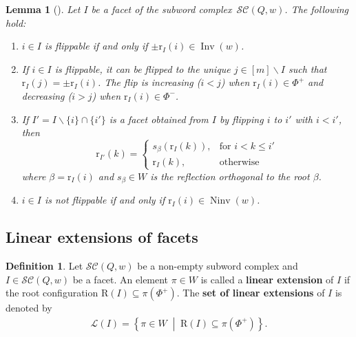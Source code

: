 \documentclass{amsart}
\newtheorem{lemma}[theorem]{Lemma}
\theoremstyle{definition}
\newtheorem{definition}[theorem]{Definition}
\newcommand{\set}[2]{\left\{ #1 \;\middle|\; #2 \right\}} %
\DeclareMathOperator{\Inv}{Inv} %
\DeclareMathOperator{\Ninv}{Ninv} %
\newcommand{\defn}[1]{\textbf{\textsf{\color{PineGreen} #1}}} %
\newcommand{\linearExtensions}{\mathcal{L}} %
\newcommand{\subwordComplex}{\mathcal{SC}} %
\newcommand{\Roots}{\mathrm{R}} %
\newcommand{\rootFunction}[2]{\mathrm{r}_{#1}(#2)} %
\begin{document}
\begin{lemma}[{\cite{CeballosLabbeStump, KnutsonMiller-subwordComplex}}]
\label{lem_rootfunction_flips}
Let $I$ be a facet of the subword complex~$\subwordComplex(Q,w)$.
The following hold:
\begin{enumerate}
    \item $i \in I$ is flippable if and only if $\pm \rootFunction{I}{i} \in \Inv(w)$.
    \item If $i \in I$ is flippable, it can be flipped to the unique $j\in [m]\smallsetminus I$ such that $\rootFunction{I}{j} = \pm\rootFunction{I}{i}$.
    The flip is increasing ($i<j$) when $\rootFunction{I}{i}\in \Phi^+$ and decreasing ($i>j$) when $\rootFunction{I}{i}\in \Phi^-$.\label{lem_rootfunction_flips2}
    \item If $I'=I\smallsetminus \{i\}\cap \{i'\}$ is a facet obtained from $I$ by flipping $i$ to $i'$ with $i<i'$, then
    \begin{equation}\label{eq_rootfunction_flip}
         \rootFunction{I'}{k} = 
  \begin{cases}
    s_\beta(\rootFunction{I}{k}), & \text{for } i < k \leq i' \\
    \rootFunction{I}{k}, & \text{otherwise}
  \end{cases}
    \end{equation}
    where $\beta=\rootFunction{I}{i}$ and $s_\beta\in W$ is the reflection orthogonal to the root $\beta$.
    \item $i \in I$ is not flippable if and only if $\rootFunction{I}{i}\in \Ninv(w)$.
\end{enumerate}
\end{lemma}

\subsection{Linear extensions of facets}

\begin{definition}
Let $\subwordComplex(Q,w)$ be a non-empty subword complex and $I\in \subwordComplex(Q,w)$ be a facet.
An element $\pi\in W$ is called a \defn{linear extension} of $I$ if the root configuration $\Roots(I)\subseteq \pi(\Phi^+)$.
The \defn{set of linear extensions} of $I$ is denoted by
\begin{align}
\linearExtensions(I)=
\set{\pi\in W}{\Roots(I)\subseteq \pi(\Phi^+)}.   
\end{align}
\end{definition}
\end{document}
